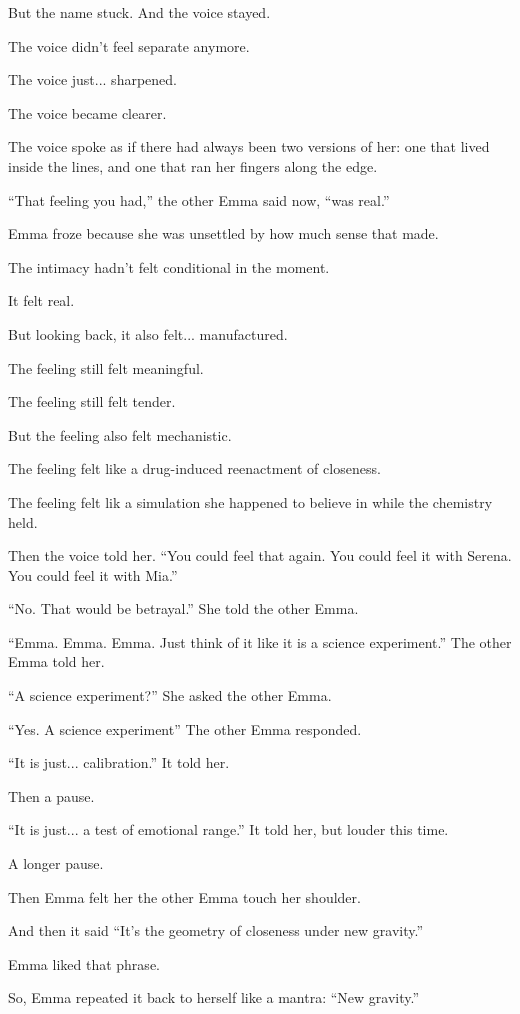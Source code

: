 But the name stuck. And the voice stayed. 

The voice didn’t feel separate anymore.  

The voice just... sharpened. 

The voice became clearer. 

The voice spoke as if there had always been two versions of her: one that lived inside the lines, 
and one that ran her fingers along the edge.

``That feeling you had,'' the other Emma said now, ``was real.''

Emma froze because she was unsettled by how much sense that made.

The intimacy hadn’t felt conditional in the moment. 

It felt real. 

But looking back, it also felt... manufactured. 

The feeling still felt meaningful.

The feeling still felt tender. 

But the feeling also felt mechanistic.

The feeling felt like a drug-induced reenactment of closeness. 

The feeling felt lik a simulation she happened to believe in while the chemistry held.

Then the voice told her. ``You could feel that again. You could feel it with Serena.  
You could feel it with Mia.''

``No. That would be betrayal.'' She told the other Emma.

``Emma. Emma. Emma. Just think of it like it is a science experiment.'' The other Emma told her.

``A science experiment?'' She asked the other Emma.

``Yes. A science experiment'' The other Emma responded.

``It is just... calibration.'' It told her.

Then a pause.

``It is just... a test of emotional range.'' It told her, but louder this time.

A longer pause.

Then Emma felt her the other Emma touch her shoulder. 

And then it said
``It's the geometry of closeness under new gravity.''

Emma liked that phrase. 

So, Emma repeated it back to herself like a mantra: ``New gravity.''

